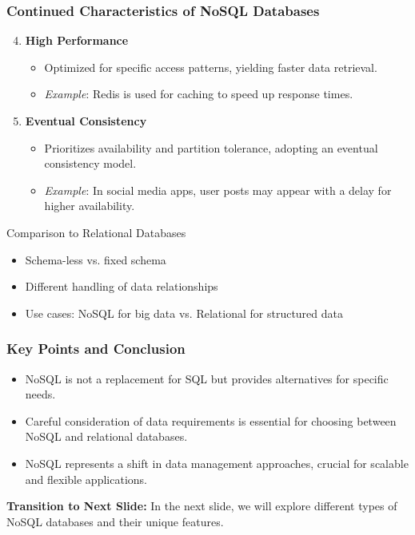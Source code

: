 \documentclass[aspectratio=169]{beamer}
\begin{document}
\begin{frame}[fragile]
    \frametitle{Continued Characteristics of NoSQL Databases}
    \begin{enumerate}
        \setcounter{enumi}{3} %
        \item \textbf{High Performance}
            \begin{itemize}
                \item Optimized for specific access patterns, yielding faster data retrieval.
                \item \textit{Example}: Redis is used for caching to speed up response times.
            \end{itemize}

        \item \textbf{Eventual Consistency}
            \begin{itemize}
                \item Prioritizes availability and partition tolerance, adopting an eventual consistency model.
                \item \textit{Example}: In social media apps, user posts may appear with a delay for higher availability.
            \end{itemize}
    \end{enumerate}
    
    \begin{block}{Comparison to Relational Databases}
        \begin{itemize}
            \item Schema-less vs. fixed schema
            \item Different handling of data relationships
            \item Use cases: NoSQL for big data vs. Relational for structured data
        \end{itemize}
    \end{block}
\end{frame}

\begin{frame}[fragile]
    \frametitle{Key Points and Conclusion}
    \begin{itemize}
        \item NoSQL is not a replacement for SQL but provides alternatives for specific needs.
        \item Careful consideration of data requirements is essential for choosing between NoSQL and relational databases.
        \item NoSQL represents a shift in data management approaches, crucial for scalable and flexible applications.
    \end{itemize}

    \textbf{Transition to Next Slide:} In the next slide, we will explore different types of NoSQL databases and their unique features.
\end{frame}
\end{document}
